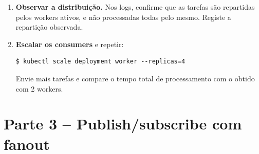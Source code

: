 \documentclass[11pt,a4paper]{article}
\begin{document}
\begin{enumerate}[label=\arabic*.,resume]
  \item \textbf{Observar a distribuição.} Nos logs, confirme que as tarefas são repartidas pelos workers ativos, e não processadas todas pelo mesmo. Registe a repartição observada.

  \item \textbf{Escalar os consumers} e repetir:
\begin{lstlisting}
$ kubectl scale deployment worker --replicas=4
\end{lstlisting}
  Envie mais tarefas e compare o tempo total de processamento com o obtido com 2 workers.

\end{enumerate}

\section{Parte 3 -- Publish/subscribe com fanout}
\end{document}
